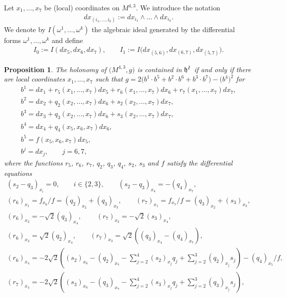 \documentclass[pdftex]{sigma}
\numberwithin{equation}{section}
\newtheorem{Proposition}[Theorem]{Proposition}
 { \theoremstyle{definition}
\newtheorem{Definition}[Theorem]{Definition}
\newtheorem{Example}[Theorem]{Example}
\newtheorem{Remark}[Theorem]{Remark} }
\newcommand\fh{{\frak h}}
\begin{document}
\begin{Definition}Let $x_1,\dots, x_7$ be (local) coordinates on $M^{4,3}$. We introduce the notation \begin{gather*}dx_{(i_1,\dots,i_k)}:=dx_{i_1}\wedge \dots \wedge dx_{i_k}.\end{gather*}
We denote by $I(\omega^1,\dots, \omega^k)$ the algebraic ideal generated by the differential forms $\omega^1,\dots, \omega^k$ and define \begin{gather*}I_0:=I(dx_5,dx_6,dx_7),\qquad I_1:=I\big(dx_{(5,6)}, dx_{(6,7)}, dx_{(5,7)}\big).\end{gather*}
\end{Definition}

\begin{Proposition}\label{Lg}The holonomy of $\big(M^{4,3},g\big)$ is contained in $\fh^I$ if and only if there are local coordinates $x_1,\dots,x_7$ such that $g=2\big(b^1\cdot b^5+b^2\cdot b^6+b^3\cdot b^7\big)- \big(b^4\big)^2$ for
\begin{gather}
b^1 = dx_1+r_5(x_1,\dots,x_7)dx_5+r_6(x_1,\dots,x_7)dx_6+r_7(x_1,\dots,x_7)dx_7,\label{beg}\\
b^2 =dx_2+ q_2(x_2,\dots,x_7)dx_6+s_2(x_2,\dots,x_7)dx_7,\\
b^3 =dx_3+ q_3(x_2,\dots,x_7)dx_6+s_3(x_2,\dots,x_7)dx_7,\\
b^4 =dx_4+ q_4(x_5,x_6,x_7)dx_6,\\
b^5 =f(x_5,x_6,x_7)dx_5,\\
b^j =dx_j,\qquad j=6,7, \label{end}
\end{gather}
 where the functions $r_5$, $r_6$, $r_7$, $q_2$, $q_3$, $q_4$, $s_2$, $s_3$ and $f$ satisfy the differential equations
\begin{gather}
(s_2-q_3)_{x_i}=0,\qquad i\in\{2,3\},\qquad (s_2-q_3)_{x_4}=-(q_4)_{x_7},\label{Eb1}\\
(r_6)_{x_1}=f_{x_6}/f=(q_2)_{x_2}+(q_3)_{x_3}, \qquad (r_7)_{x_1}=f_{x_7}/f=(q_3)_{x_2}+(s_3)_{x_3},\label{Eb2}\\
(r_6)_{x_2}=-\sqrt{2} (q_3)_{x_4},\qquad \, (r_7)_{x_2}=-\sqrt{2} (s_3)_{x_4},\label{Eb3}\\
(r_6)_{x_3}=\sqrt{2} (q_2)_{x_4},\qquad (r_7)_{x_3}=\sqrt{2} ((q_3)_{x_4}-(q_4)_{x_7}),\label{Eb4}\\
(r_6)_{x_4}= -2\sqrt{2}\left((s_2)_{x_6}-(q_2)_{x_7}-\sum_{j=2}^4(s_2)_{x_j}q_j+\sum_{j=2}^3(q_2)_{x_j}s_j\right)-(q_4)_{x_5}/f ,\label{Eb4a}\\
(r_7)_{x_4}= -2\sqrt{2}\left((s_3)_{x_6}-(q_3)_{x_7}-\sum_{j=2}^4(s_3)_{x_j}q_j+\sum_{j=2}^3(q_3)_{x_j}s_j\right) ,\label{Eb5}\\

\end{gather}
\end{Proposition}
\end{document}
